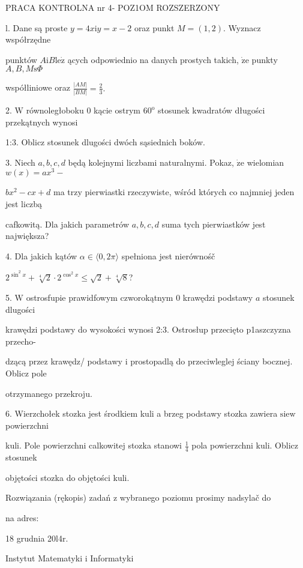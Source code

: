 \documentclass[a4paper,12pt]{article}
\begin{document}
PRACA KONTROLNA nr 4- POZ1OM ROZSZERZONY

l. Dane są proste $y = 4x \mathrm{i} y = x-2$ oraz punkt $M = (1,2)$. Wyznacz współrzędne

punktów $A\mathrm{i}B\mathrm{l}\mathrm{e}\dot{\mathrm{z}}$ ących odpowiednio na danych prostych takich, $\dot{\mathrm{z}}\mathrm{e}$ punkty $A, B,  M\mathrm{s}\Phi$

współliniowe oraz $\displaystyle \frac{|AM|}{|BM|}=\frac{2}{3}.$

2. $\mathrm{W}$ równoległoboku $0$ kącie ostrym $60^{\mathrm{o}}$ stosunek kwadratów długości przekątnych wynosi

1:3. Oblicz stosunek dlugości dwóch sąsiednich boków.

3. Niech $a, b, c, d$ będą kolejnymi liczbami naturalnymi. Pokaz, $\dot{\mathrm{z}}\mathrm{e}$ wielomian $w(x)=ax^{3}-$

$bx^{2}-cx+d$ ma trzy pierwiastki rzeczywiste, wśród których co najmniej jeden jest liczbą

cafkowitą. Dla jakich parametrów $a, b, c, d$ suma tych pierwiastków jest największa?

4. Dla jakich kątów $\alpha\in\langle 0,  2\pi\rangle$ spełniona jest nierównośč

$2^{\sin^{2}x}+\sqrt[4]{2}\cdot 2^{\cos^{2}x}\leq\sqrt{2}+\sqrt[4]{8}$?

5. $\mathrm{W}$ ostrosfupie prawidfowym czworokątnym $0$ krawędzi podstawy $a$ stosunek dlugości

krawędzi podstawy do wysokości wynosi 2:3. Ostrosłup przecięto p1aszczyzna przecho-

dzącą przez krawędz/ podstawy $\mathrm{i}$ prostopadlą do przeciwleglej ściany bocznej. Oblicz pole

otrzymanego przekroju.

6. Wierzchołek stozka jest środkiem kuli a brzeg podstawy stozka zawiera $\mathrm{s}\mathrm{i}\mathrm{e}\mathrm{w}$ powierzchni

kuli. Pole powierzchni calkowitej stozka stanowi $\displaystyle \frac{1}{4}$ pola powierzchni kuli. Oblicz stosunek

objętości stozka do objętości kuli.

Rozwiązania (rękopis) zadań z wybranego poziomu prosimy nadsylač do

na adres:

18 grudnia 20l4r.

Instytut Matematyki $\mathrm{i}$ Informatyki
\end{document}
